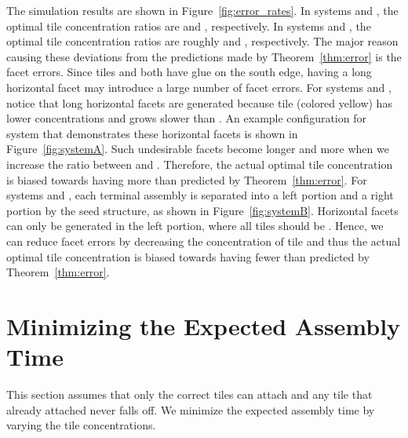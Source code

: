 \documentclass[11pt]{article}
\begin{document}
The simulation results are shown in Figure~\ref{fig:error_rates}. In systems  and , the optimal tile concentration ratios are  and , respectively. In systems  and , the optimal tile concentration ratios are roughly  and , respectively. The major reason causing these deviations from the predictions made by Theorem~\ref{thm:error} is the facet errors. Since tiles  and  both have glue  on the south edge, having a long horizontal facet may introduce a large number of facet errors. For systems  and , notice that long horizontal facets are generated because tile  (colored yellow) has lower concentrations and grows slower than . An example configuration for system  that demonstrates these horizontal facets is shown in Figure~\ref{fig:systemA}. Such undesirable facets become longer and more when we increase the ratio between  and . Therefore, the actual optimal tile concentration is biased towards having more  than predicted by Theorem~\ref{thm:error}. For systems  and , each terminal assembly is separated into a left portion and a right portion by the seed structure, as shown in Figure~\ref{fig:systemB}. Horizontal facets can only be generated in the left portion, where all tiles should be . Hence, we can reduce facet errors by decreasing the concentration of tile  and thus the actual optimal tile concentration is biased towards having fewer  than predicted by Theorem~\ref{thm:error}.




\section{Minimizing the Expected Assembly Time}
\label{sec:time}

This section assumes that only the correct tiles can attach and any tile that already attached never falls off. We minimize the expected assembly time by varying the tile concentrations.
\end{document}
